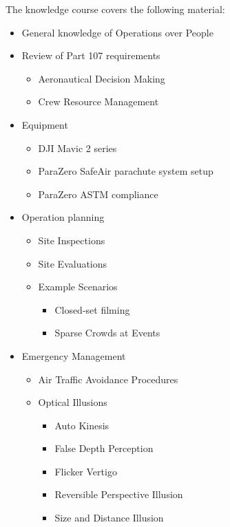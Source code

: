 \documentclass[
]{book}
\providecommand{\tightlist}{%
  \setlength{\itemsep}{0pt}\setlength{\parskip}{0pt}}
\begin{document}
The knowledge course covers the following material:

\begin{itemize}
\item
  General knowledge of Operations over People
\item
  Review of Part 107 requirements

  \begin{itemize}
  \tightlist
  \item
    Aeronautical Decision Making
  \item
    Crew Resource Management
  \end{itemize}
\item
  Equipment

  \begin{itemize}
  \tightlist
  \item
    DJI Mavic 2 series
  \item
    ParaZero SafeAir parachute system setup
  \item
    ParaZero ASTM compliance
  \end{itemize}
\item
  Operation planning

  \begin{itemize}
  \item
    Site Inspections
  \item
    Site Evaluations
  \item
    Example Scenarios

    \begin{itemize}
    \tightlist
    \item
      Closed-set filming
    \item
      Sparse Crowds at Events
    \end{itemize}
  \end{itemize}
\item
  Emergency Management

  \begin{itemize}
  \item
    Air Traffic Avoidance Procedures
  \item
    Optical Illusions

    \begin{itemize}
    \tightlist
    \item
      Auto Kinesis
    \item
      False Depth Perception
    \item
      Flicker Vertigo
    \item
      Reversible Perspective Illusion
    \item
      Size and Distance Illusion
    \end{itemize}
  \end{itemize}
\end{itemize}
\end{document}
